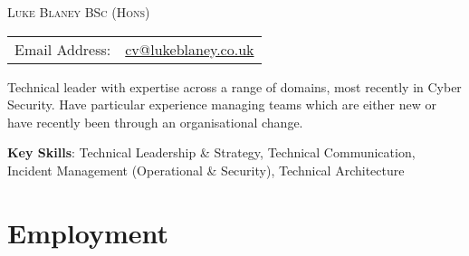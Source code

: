 \documentclass[a4paper]{article}
\newenvironment{detail}{\begin{adjustwidth}{10pt}{}}{\end{adjustwidth}}
\begin{document}
\begin{center}\textsc{\LARGE Luke Blaney BSc (Hons)}\end{center}

\begin{tabular}{ l l }

Email Address: & \href{mailto:cv@lukeblaney.co.uk}{cv@lukeblaney.co.uk}\\

\end{tabular}

\begin{detail}
Technical leader with expertise across a range of domains, most recently in Cyber Security.  Have particular experience managing teams which are either new or have recently been through an organisational change.
\end{detail}

{\bf Key Skills}: Technical Leadership \& Strategy, Technical Communication, Incident Management (Operational \& Security), Technical Architecture

\section*{Employment}
\end{document}
